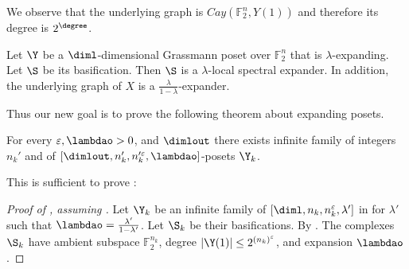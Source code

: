 %
%
%
     We observe that the underlying graph is \(Cay(\mathbb{F}_2^n,Y(1))\) and therefore its degree is \(2^\degree\).
\begin{proposition} \label{prop:basification}
    Let \(\Y\) be a \(\diml\)-dimensional Grassmann poset over \(\mathbb{F}_2^n\) that is \(\lambda\)-expanding. Let \(\S\) be its basification. Then \(\S\) is a \(\lambda\)-local spectral expander. In addition, the underlying graph of \(X\) is a \(\frac{\lambda}{1-\lambda}\)-expander.
\end{proposition}
%
Thus our new goal is to prove the following theorem about expanding posets.
\begin{theorem} \label{thm:main-recursive-Grassmann}
    For every \(\varepsilon, \lambdao >0\), and \(\dimlout\) there exists infinite family of integers \(n_k'\) and of \([\dimlout,n_k',n_k'^\varepsilon,\lambdao]\)-posets \(\Y_k\).
\end{theorem}
This is sufficient to prove :
\begin{proof}[Proof of , assuming ]
    Let \(\Y_k\) be an infinite family of \([\diml,n_k,n_k^\varepsilon,\lambda']\) in  for \(\lambda'\) such that \(\lambdao = \frac{\lambda'}{1-\lambda'}\). Let \(\S_k\) be their basifications. By . The complexes \(\S_k\) have ambient subspace \(\mathbb{F}_2^{n_k}\), degree \(|\Y(1)| \leq 2^{(n_k)^\varepsilon}\), and expansion \(\lambdao\).
\end{proof}

